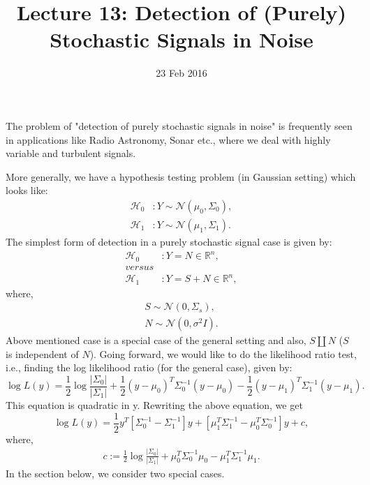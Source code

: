 \documentclass[a4paper,english,12pt]{article}
\title{Lecture 13: Detection of (Purely) Stochastic Signals in Noise}
\date{23 Feb 2016}
\author{}
\begin{document}
\maketitle
The problem of "detection of purely stochastic signals in noise" is frequently seen in applications like Radio Astronomy, Sonar etc., where we deal with highly variable and turbulent signals.
\par More generally, we have a hypothesis testing problem (in Gaussian setting) which looks like:
\begin{align}
\label{n1}
\mathcal{H}_0 &: Y \sim \mathcal{N}(\mu_0,\Sigma_0),\\
\mathcal{H}_1 &: Y \sim \mathcal{N}(\mu_1,\Sigma_1).
\end{align}
The simplest form of detection in a purely stochastic signal case is given by:
\begin{align}
\mathcal{H}_0 &: Y = N \in \mathbb{R}^n,\\
versus\\
\mathcal{H}_1 &: Y = S+N \in \mathbb{R}^n,
\end{align}
where,  
\begin{align}\label{eqn:setting1}
S\sim \mathcal{N}(0,\Sigma_s),\\
N\sim \mathcal{N}(0,\sigma^2I).
\end{align}
Above mentioned case is a special case of the general setting and also, $S\amalg N$ ($S$ is independent of $N$).
Going forward, we would like to do the likelihood ratio test, i.e., finding the log likelihood ratio (for the general case), given by:
\begin{equation}
\log L(y)= \frac{1}{2}\log\frac{|\Sigma_0|}{|\Sigma_1|}+\frac{1}{2}(y-\mu_0)^T\Sigma_0^{-1}(y-\mu_0)-\frac{1}{2}(y-\mu_1)^T\Sigma_1^{-1}(y-\mu_1).
\end{equation}
This equation is quadratic in y. Rewriting the above equation, we get
\begin{equation}
\log L(y)=\frac{1}{2}y^T[\Sigma_0^{-1}-\Sigma_1^{-1}]y+[\mu_1^T\Sigma_1^{-1}-\mu_0^T\Sigma_0^{-1}]y+c,
\end{equation}
where,
\begin{align*}
c:=\frac{1}{2}\log\frac{|\Sigma_0|}{|\Sigma_1|}+\mu_0^T\Sigma_0^{-1}\mu_0-\mu_1^T\Sigma_1^{-1}\mu_1.
\end{align*}
In the section below, we consider two special cases.
\end{document}
